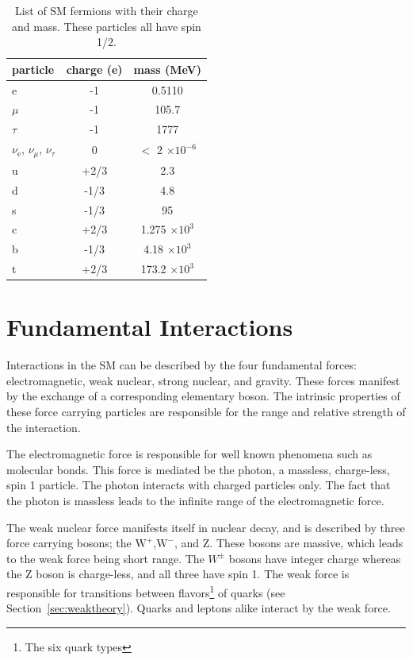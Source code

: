 \begin{table}[h]
\begin{center}
\begin{tabular}{l|c|c}
\hline
\hline
particle & charge (e) & mass (MeV)\\ \hline \hline
e & -1 & 0.5110 \\
$\mu$ & -1 & 105.7\\
$\tau$ & -1 & 1777\\
$\nu_{\mathrm{e}}$, $\nu_{\mu}$, $\nu_{\tau}$ & 0 & $<$ 2 $\times \mathrm{10^{-6}}$ \\
u & +2/3 & 2.3\\
d & -1/3 & 4.8\\
s & -1/3 & 95\\
c & +2/3 & 1.275 $\times \mathrm{10^3}$ \\
b & -1/3 & 4.18 $\times \mathrm{10^3}$\\
t & +2/3 & 173.2 $\times \mathrm{10^3}$\\
\hline
\end{tabular}
\end{center}
\caption{List of SM fermions with their charge and mass.  These particles all have spin 1/2.}
\label{table:SMferm}
\end{table}


\section{Fundamental Interactions}
Interactions in the SM can be described by the four fundamental forces: electromagnetic, weak nuclear, strong nuclear, and gravity.  
These forces manifest by the exchange of a corresponding elementary boson.  
The intrinsic properties of these force carrying particles are responsible for the range and relative strength of the interaction.


The electromagnetic force is responsible for well known phenomena such as molecular bonds.  
This force is mediated be the photon, a massless, charge-less, spin 1 particle.  
The photon interacts with charged particles only.        
The fact that the photon is massless leads to the infinite range of the electromagnetic force.  


The weak nuclear force manifests itself in nuclear decay, and is described by three force carrying bosons; the $\mathrm{W^+}$,$\mathrm{W^-}$, and Z.  
These bosons are massive, which leads to the weak force being short range.  
The $W^{\pm}$ bosons have integer charge whereas the Z boson is charge-less, and all three have spin 1.  
The weak force is responsible for transitions between flavors\footnote{The six quark types} of quarks (see Section~\ref{sec:weaktheory}).
Quarks and leptons alike interact by the weak force.


